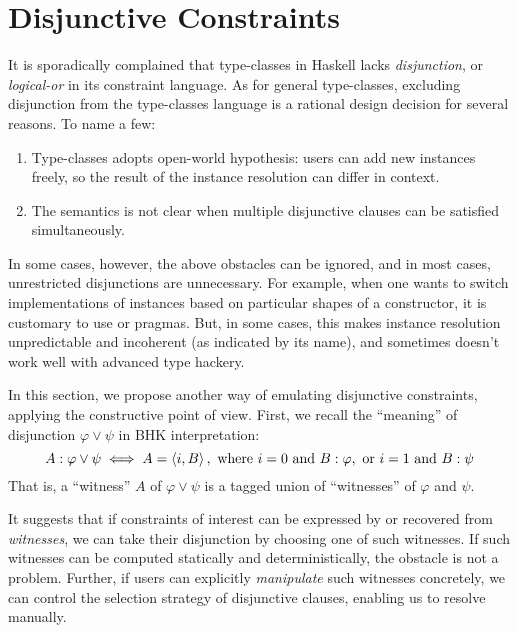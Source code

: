 \documentclass[demotion-paper]{subfiles}
\begin{document}
\section{Disjunctive Constraints}
\label{sec:disj}
It is sporadically complained that type-classes in Haskell lacks \emph{disjunction}, or \emph{logical-or} in its constraint language.
As for general type-classes, excluding disjunction from the type-classes language is a rational design decision for several reasons.
To name a few:
\begin{enumerate}
  \item Type-classes adopts open-world hypothesis: users can add new instances freely, so the result of the instance resolution can differ in context.
  \label{item:openness}
  \item The semantics is not clear when multiple disjunctive clauses can be satisfied simultaneously.
  \label{item:arb-choice}
\end{enumerate}
In some cases, however, the above obstacles can be ignored, and in most cases, unrestricted disjunctions are unnecessary.
For example, when one wants to switch implementations of instances based on particular shapes of a constructor, it is customary to use  or  pragmas.
But, in some cases, this makes instance resolution unpredictable and incoherent (as indicated by its name), and sometimes doesn't work well with advanced type hackery.

In this section, we propose another way of emulating disjunctive constraints, applying the constructive point of view.
First, we recall the ``meaning'' of disjunction $\varphi \vee \psi$ in BHK interpretation:
\[
  A: \varphi \vee \psi \iff A = \braket{i, B},\text{ where }
  i = 0 \text{ and } B: \varphi, \text{ or }
  i = 1 \text{ and } B: \psi
\]
That is, a ``witness'' $A$ of $\varphi \vee \psi$ is a tagged union of ``witnesses'' of $\varphi$ and $\psi$.

It suggests that if constraints of interest can be expressed by or recovered from \emph{witnesses}, we can take their disjunction by choosing one of such witnesses.
If such witnesses can be computed statically and deterministically, the obstacle  is not a problem.
Further, if users can explicitly \emph{manipulate} such witnesses concretely, we can control the selection strategy of disjunctive clauses, enabling us to resolve  manually.
\end{document}
